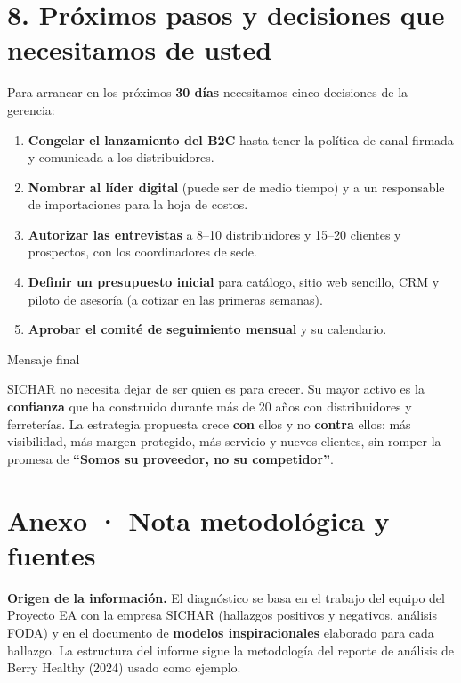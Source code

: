 \documentclass[11pt,a4paper]{article}
\begin{document}
\hypertarget{pruxf3ximos-pasos-y-decisiones-que-necesitamos-de-usted}{%
\section{8. Próximos pasos y decisiones que necesitamos de
usted}\label{pruxf3ximos-pasos-y-decisiones-que-necesitamos-de-usted}}

Para arrancar en los próximos \textbf{30 días} necesitamos cinco decisiones de la gerencia:

\begin{enumerate}
\def\labelenumi{\arabic{enumi}.}
\item
  \textbf{Congelar el lanzamiento del B2C} hasta tener la política de canal firmada y comunicada a
  los distribuidores.
\item
  \textbf{Nombrar al líder digital} (puede ser de medio tiempo) y a un responsable de importaciones
  para la hoja de costos.
\item
  \textbf{Autorizar las entrevistas} a 8--10 distribuidores y 15--20 clientes y prospectos, con los
  coordinadores de sede.
\item
  \textbf{Definir un presupuesto inicial} para catálogo, sitio web sencillo, CRM y piloto de
  asesoría (a cotizar en las primeras semanas).
\item
  \textbf{Aprobar el comité de seguimiento mensual} y su calendario.
\end{enumerate}

\begin{cajamarca}{Mensaje final}

SICHAR no necesita dejar de ser quien es para crecer. Su mayor activo es la \textbf{confianza} que
ha construido durante más de 20 años con distribuidores y ferreterías. La estrategia propuesta crece
\textbf{con} ellos y no \textbf{contra} ellos: más visibilidad, más margen protegido, más servicio y
nuevos clientes, sin romper la promesa de \textbf{``Somos su proveedor, no su competidor''}.

\end{cajamarca}

\hypertarget{anexo-nota-metodoluxf3gica-y-fuentes}{%
\section{Anexo · Nota metodológica y fuentes}\label{anexo-nota-metodoluxf3gica-y-fuentes}}

\textbf{Origen de la información.} El diagnóstico se basa en el trabajo del equipo del Proyecto EA
con la empresa SICHAR (hallazgos positivos y negativos, análisis FODA) y en el documento de
\textbf{modelos inspiracionales} elaborado para cada hallazgo. La estructura del informe sigue la
metodología del reporte de análisis de Berry Healthy (2024) usado como ejemplo.
\end{document}
